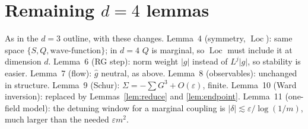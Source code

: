 \documentclass[11pt]{article}
\theoremstyle{definition}
\theoremstyle{remark}
\newcommand{\Loc}{\operatorname{Loc}}
\newcommand{\eps}{\varepsilon}
\begin{document}
\section{Remaining $d=4$ lemmas}

As in the $d=3$ outline, with these changes. Lemma~4 (symmetry, $\Loc$): same space
$\{S,Q,\text{wave-function}\}$; in $d=4$ $Q$ is marginal, so $\Loc$ must include it at
dimension $d$. Lemma~6 (RG step): norm weight $|g|$ instead of $L^j|g|$, so stability is
easier. Lemma~7 (flow): $\hat g$ neutral, as above. Lemma~8 (observables): unchanged in
structure. Lemma~9 (Schur): $\Sigma=-\sum G^3+O(\eps)$, finite. Lemma~10 (Ward inversion):
replaced by Lemmas~\ref{lem:reduce} and \ref{lem:endpoint}. Lemma~11 (one-field model): the
detuning window for a marginal coupling is $|\delta|\lesssim\eps/\log(1/m)$, much larger
than the needed $\eps m^2$.
\end{document}
